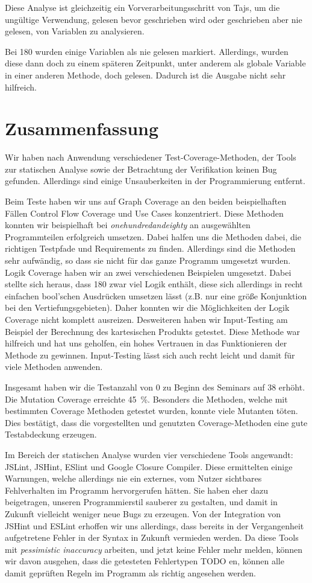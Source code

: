 \documentclass[ngerman]{article}
\begin{document}
Diese Analyse ist gleichzeitig ein Vorverarbeitungsschritt von Tajs, um die ungültige Verwendung, gelesen bevor geschrieben wird oder geschrieben aber nie gelesen, von Variablen zu analysieren.

Bei 180 wurden einige Variablen als nie gelesen markiert. Allerdings, wurden diese dann doch zu einem späteren Zeitpunkt, unter anderem als globale Variable in einer anderen Methode, doch gelesen. Dadurch ist die Ausgabe nicht sehr hilfreich.

\section{Zusammenfassung}

Wir haben nach Anwendung verschiedener Test-Coverage-Methoden, der Tools zur statischen Analyse sowie der Betrachtung der Verifikation keinen Bug gefunden.
Allerdings sind einige Unsauberkeiten in der Programmierung entfernt.

Beim Teste haben wir uns auf Graph Coverage an den beiden beispielhaften Fällen Control Flow Coverage und Use Cases konzentriert.
Diese Methoden konnten wir beispielhaft bei \emph{onehundredandeighty} an ausgewählten Programmteilen erfolgreich umsetzen.
Dabei halfen uns die Methoden dabei, die richtigen Testpfade und Requirements zu finden.
Allerdings sind die Methoden sehr aufwändig, so dass sie nicht für das ganze Programm umgesetzt wurden.
Logik Coverage haben wir an zwei verschiedenen Beispielen umgesetzt.
Dabei stellte sich heraus, dass 180 zwar viel Logik enthält, diese sich allerdings in recht einfachen bool'schen Ausdrücken umsetzen lässt (z.B. nur eine größe Konjunktion bei den Vertiefungsgebieten).
Daher konnten wir die Möglichkeiten der Logik Coverage nicht komplett ausreizen.
Desweiteren haben wir Input-Testing am Beispiel der Berechnung des kartesischen Produkts getestet.
Diese Methode war hilfreich und hat uns geholfen, ein hohes Vertrauen in das Funktionieren der Methode zu gewinnen.
Input-Testing lässt sich auch recht leicht und damit für viele Methoden anwenden.

Insgesamt haben wir die Testanzahl von 0 zu Beginn des Seminars auf 38 erhöht.
Die Mutation Coverage erreichte 45~\%.
Besonders die Methoden, welche mit bestimmten Coverage Methoden getestet wurden, konnte viele Mutanten töten.
Dies bestätigt, dass die vorgestellten und genutzten Coverage-Methoden eine gute Testabdeckung erzeugen.

Im Bereich der statischen Analyse wurden vier verschiedene Tools angewandt: JSLint, JSHint, ESlint und Google Closure Compiler.
Diese ermittelten einige Warnungen, welche allerdings nie ein externes, vom Nutzer sichtbares Fehlverhalten im Programm hervorgerufen hätten.
Sie haben eher dazu beigetragen, unseren Programmierstil sauberer zu gestalten, und damit in Zukunft vielleicht weniger neue Bugs zu erzeugen.
Von der Integration von JSHint und ESLint erhoffen wir uns allerdings, dass bereits in der Vergangenheit aufgetretene Fehler in der Syntax in Zukunft vermieden werden.
Da diese Tools mit \emph{pessimistic inaccuracy} arbeiten, und jetzt keine Fehler mehr melden, können wir davon ausgehen, dass die getesteten Fehlertypen 
TODO
en, können alle damit geprüften Regeln im Programm als richtig angesehen werden.
\end{document}
